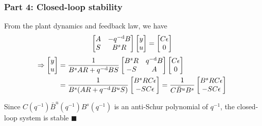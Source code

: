 \begin{frame}
    \frametitle{Part 4: Closed-loop stability}

    From the plant dynamics and feedback law, we have
    \begin{align*}
        \begin{bmatrix}
                A & -q^{-\textrm{d}} B \\
                S & B^s R
            \end{bmatrix} \begin{bmatrix}
                y \\
                u
            \end{bmatrix} = \begin{bmatrix}
                C\epsilon \\
                0
            \end{bmatrix}
    \end{align*}
    \pause
    \begin{align*}
        \Rightarrow \begin{bmatrix}
                y \\
                u
            \end{bmatrix} & = \frac{1}{B^s AR + q^{-\textrm{d}} BS} \begin{bmatrix}
                B^s R & q^{-\textrm{d}} B \\
                -S & A
            \end{bmatrix} \begin{bmatrix}
                C\epsilon \\
                0
            \end{bmatrix} \\
        & = \frac{1}{B^s (AR + q^{-\textrm{d}} B^uS)} \begin{bmatrix}
                B^s RC\epsilon \\
                -SC\epsilon
            \end{bmatrix} = \frac{1}{C \bar{B}^u B^s} \begin{bmatrix}
                B^s RC\epsilon \\
                -SC\epsilon
            \end{bmatrix}
    \end{align*}
    \pause

    Since $C(q^{-1}) \bar{B}^u(q^{-1}) B^s(q^{-1})$ is an anti-Schur polynomial of $q^{-1}$, the closed-loop system is stable
    \hfill $\blacksquare$

\end{frame}

